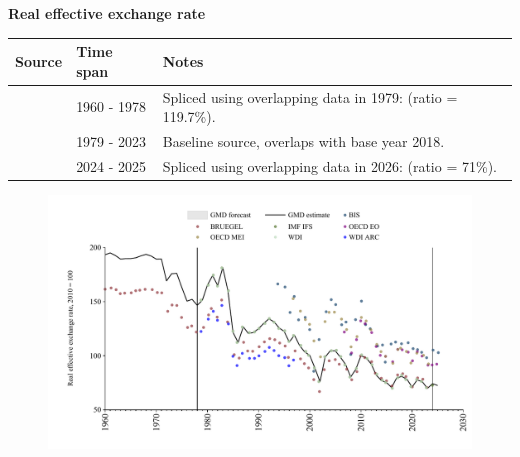 \documentclass[12pt,a4paper,landscape]{article}
\begin{document}
\begin{adjustbox}{max totalsize={\paperwidth}{\paperheight},center}
\begin{minipage}[t][\textheight][t]{\textwidth}
\vspace*{0.5cm}
{}
\begin{center}
{\Large\bfseries Real effective exchange rate}
\end{center}
\vspace{0.5cm}
\begin{table}[H]
\centering
\small
\begin{tabular}{|l|l|l|}
\hline
\textbf{Source} & \textbf{Time span} & \textbf{Notes} \\
\hline
\rowcolor{white}\cite{BRUEGEL}& 1960 - 1978 &Spliced using overlapping data in 1979: (ratio = 119.7\%). \\
\rowcolor{lightgray}\cite{WDI}& 1979 - 2023 &Baseline source, overlaps with base year 2018. \\
\rowcolor{white}\cite{BIS}& 2024 - 2025 &Spliced using overlapping data in 2026: (ratio = 71\%). \\
\hline
\end{tabular}
\end{table}
\begin{figure}[H]
\centering
\includegraphics[width=\textwidth,height=0.6\textheight,keepaspectratio]{graphs/ZAF_REER.pdf}
\end{figure}
\end{minipage}
\end{adjustbox}
\end{document}
